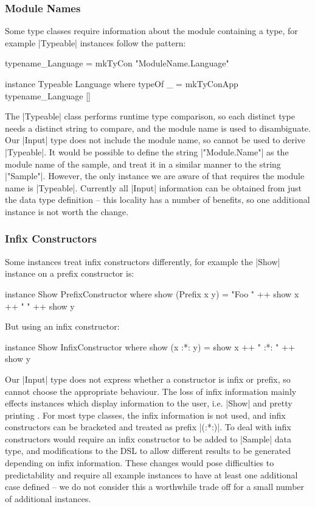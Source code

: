 \documentclass[preprint,draft]{sigplanconf}
\begin{document}
\subsubsection{Module Names}
\label{sec:failure_typeable}

Some type classes require information about the module containing a type, for example |Typeable| instances \cite{lammel:syb} follow the pattern:

\begin{code}
typename_Language = mkTyCon "ModuleName.Language"

instance Typeable Language where
    typeOf _ = mkTyConApp typename_Language []
\end{code}

The |Typeable| class performs runtime type comparison, so each distinct type needs a distinct string to compare, and the module name is used to disambiguate. Our |Input| type does not include the module name, so cannot be used to derive |Typeable|. It would be possible to define the string |"Module.Name"| as the module name of the sample, and treat it in a similar manner to the string |"Sample"|. However, the only instance we are aware of that requires the module name is |Typeable|. Currently all |Input| information can be obtained from just the data type definition -- this locality has a number of benefits, so one additional instance is not worth the change.

\subsubsection{Infix Constructors}

Some instances treat infix constructors differently, for example the |Show| instance on a prefix constructor is:

\begin{code}
instance Show PrefixConstructor where
    show (Prefix x y) = "Foo " ++ show x ++ " " ++ show y
\end{code}

\noindent But using an infix constructor:

\begin{code}
instance Show InfixConstructor where
    show (x :*: y) = show x ++ " :*: " ++ show y
\end{code}

Our |Input| type does not express whether a constructor is infix or prefix, so cannot choose the appropriate behaviour. The loss of infix information mainly effects instances which display information to the user, i.e. |Show| and pretty printing \cite{hughes:pretty_printing}. For most type classes, the infix information is not used, and infix constructors can be bracketed and treated as prefix |(:*:)|. To deal with infix constructors would require an infix constructor to be added to |Sample| data type, and modifications to the DSL to allow different results to be generated depending on infix information. These changes would pose difficulties to predictability and require all example instances to have at least one additional case defined -- we do not consider this a worthwhile trade off for a small number of additional instances.
\end{document}
